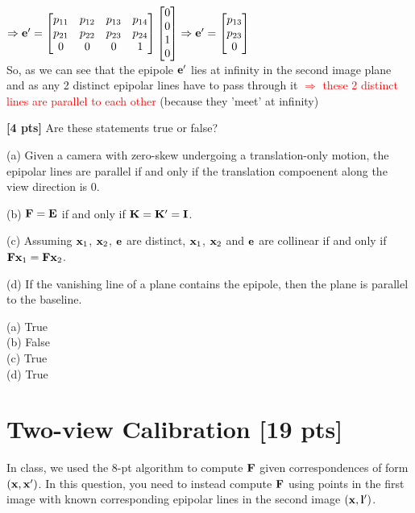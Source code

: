 \documentclass[11pt,addpoints,answers]{exam}
\numberwithin{equation}{section} %
\numberwithin{figure}{section} %
\numberwithin{table}{section} %
\begin{document}
\begin{questions}
\begin{tcolorbox}[fit,height=6cm, width=\textwidth, blank, borderline={0.5pt}{-2pt},halign=left, valign=center, nobeforeafter]
$\Rightarrow \mathbf{e}' = \begin{bmatrix}
p_{11} & p_{12} & p_{13} & p_{14} \\ 
p_{21} & p_{22} & p_{23} & p_{24} \\ 
0 & 0 & 0 & 1
\end{bmatrix} \begin{bmatrix} 0\\0\\1\\0 \end{bmatrix} \Rightarrow \mathbf{e}' = \begin{bmatrix} p_{13}\\p_{23}\\0 \end{bmatrix}$\\

So, as we can see that the epipole $\mathbf{e}'$ lies at infinity in the second image plane and as any 2 distinct epipolar lines have to pass through it \textcolor{red}{$\Rightarrow$ these 2 distinct lines are parallel to each other} (because they 'meet' at infinity)

\end{tcolorbox}
\clearpage
\question \textbf{[4 pts]} Are these statements true or false?  

(a) Given a camera with zero-skew undergoing a translation-only motion, the epipolar lines are parallel if and only if the translation compoenent along the view direction is $0$.

(b) $\mathbf{F} = \mathbf{E}$ if and only if $\mathbf{K} = \mathbf{K}' = \mathbf{I}$. 

(c) Assuming $\mathbf{x}_1$, $\mathbf{x}_2$, $\mathbf{e}$ are distinct, $\mathbf{x}_1$, $\mathbf{x}_2$ and $\mathbf{e}$ are collinear if and only if $\mathbf{F}\mathbf{x}_1 = \mathbf{F}\mathbf{x}_2$.

(d) If the vanishing line of a plane contains the epipole, then the plane is parallel to the baseline.

\begin{tcolorbox}[fit,height=4cm, width=\textwidth, blank, borderline={0.5pt}{-2pt},halign=left, valign=center, nobeforeafter]

(a) True \\
(b) False \\
(c) True\\
(d) True\\

\end{tcolorbox}

\section{Two-view Calibration [19 pts]}
\question In class, we used the $8$-pt algorithm to compute $\mathbf{F}$ given correspondences of form $(\mathbf{x}, \mathbf{x}')$. In this question, you need to instead compute $\mathbf{F}$ using points in the first image with known corresponding epipolar lines in the second image $(\mathbf{x}, \mathbf{l}')$.


\end{questions}
\end{document}
